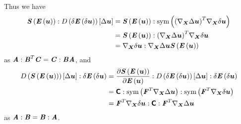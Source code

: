 Thus we have
\begin{equation}
  \begin{split}
    \doubledotprod{\fnof{\tensor{S}}{\fnof{\tensor{E}}{\vectr{u}}}}{\directionalderiv{\delta\fnof{\tensor{E}}{\delta\vectr{u}}}{\Delta\vectr{u}}}&=
    \doubledotprod{\fnof{\tensor{S}}{\fnof{\tensor{E}}{\vectr{u}}}}{\sympart\pbrac{\transpose{\pbrac{\gradient{\vectr{X}}{\Delta\vectr{u}}}}\gradient{\vectr{X}}{\delta\vectr{u}}}}\\
    &=\doubledotprod{\fnof{\tensor{S}}{\fnof{\tensor{E}}{\vectr{u}}}}{\transpose{\pbrac{\gradient{\vectr{X}}{\Delta\vectr{u}}}}\gradient{\vectr{X}}{\delta\vectr{u}}}\\
    &=\doubledotprod{\gradient{\vectr{X}}{\delta\vectr{u}}}{\gradient{\vectr{X}}{\Delta\vectr{u}}\fnof{\tensor{S}}{\fnof{\tensor{E}}{\vectr{u}}}}
  \end{split}
\end{equation}
as
$\boldsymbol{\mathit{A}}:{\boldsymbol{\mathit{B}}}^{T}\boldsymbol{\mathit{C}}=\boldsymbol{\mathit{C}}:\boldsymbol{\mathit{B}}\boldsymbol{\mathit{A}}$, and
\begin{equation}
  \begin{split}
    \doubledotprod{\directionalderiv{\fnof{\tensor{S}}{\fnof{\tensor{E}}{\vectr{u}}}}{\Delta\vectr{u}}}{\delta\fnof{\tensortwo{E}}{\delta\vectr{u}}}
    &=\doubledotprod{\doubledotprod{\delby{\fnof{\tensor{S}}{\fnof{\tensor{E}}{\vectr{u}}}}{\fnof{\tensor{E}}{\vectr{u}}}}{\directionalderiv{\delta\fnof{\tensor{E}}{\delta\vectr{u}}}{\Delta\vectr{u}}}}{\delta\fnof{\tensor{E}}{\delta\vectr{u}}}\\
    &=\doubledotprod{\doubledotprod{\tensorfour{C}}{\sympart\pbrac{\transpose{\tensortwo{F}}\gradient{\vectr{X}}{\Delta\vectr{u}}}}}{\sympart\pbrac{\transpose{\tensortwo{F}}\gradient{\vectr{X}}{\delta\vectr{u}}}}\\
    &=\doubledotprod{\transpose{\tensortwo{F}}\gradient{\vectr{X}}{\delta\vectr{u}}}{\doubledotprod{\tensorfour{C}}{\transpose{\tensortwo{F}}\gradient{\vectr{X}}{\Delta\vectr{u}}}}
  \end{split}
\end{equation}
as
$\boldsymbol{\mathit{A}}:\boldsymbol{\mathit{B}}=\boldsymbol{\mathit{B}}:\boldsymbol{\mathit{A}}$.

